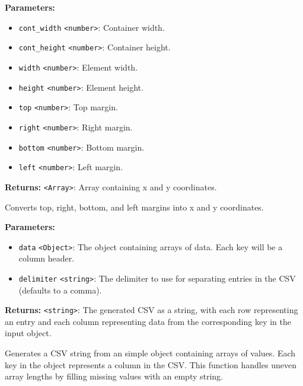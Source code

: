 \documentclass[12pt,a4paper]{article}
\begin{document}
\noindent \textbf{Parameters:}
\begin{itemize}
  \item \texttt{cont\_width} \texttt{<number>}: Container width.
  \item \texttt{cont\_height} \texttt{<number>}: Container height.
  \item \texttt{width} \texttt{<number>}: Element width.
  \item \texttt{height} \texttt{<number>}: Element height.
  \item \texttt{top} \texttt{<number>}: Top margin.
  \item \texttt{right} \texttt{<number>}: Right margin.
  \item \texttt{bottom} \texttt{<number>}: Bottom margin.
  \item \texttt{left} \texttt{<number>}: Left margin.
\end{itemize}

\noindent \textbf{Returns:} \texttt{<Array>}: Array containing x and y coordinates.

\noindent Converts top, right, bottom, and left margins into x and y coordinates.

\vspace{5mm}
\noindent {}


\noindent \textbf{Parameters:}
\begin{itemize}
  \item \texttt{data} \texttt{<Object>}: The object containing arrays of data. Each key will be a column header.
  \item \texttt{delimiter} \texttt{<string>}: The delimiter to use for separating entries in the CSV (defaults to a comma).
\end{itemize}

\noindent \textbf{Returns:} \texttt{<string>}: The generated CSV as a string, with each row representing an entry and each column representing data from the corresponding key in the input object.

\noindent Generates a CSV string from an simple object containing arrays of values.
Each key in the object represents a column in the CSV. This function handles uneven array lengths by filling missing values with an empty string.

\vspace{5mm}
\noindent {}
\end{document}
